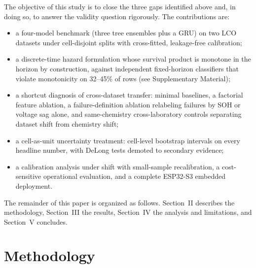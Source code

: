 \documentclass[11pt,a4paper]{article}
\begin{document}
The objective of this study is to close the three gaps identified above and, in doing so, to answer the validity question rigorously. The contributions are:
\begin{itemize}
\item a four-model benchmark (three tree ensembles plus a GRU) on two LCO datasets under cell-disjoint splits with cross-fitted, leakage-free calibration;
\item a discrete-time hazard formulation whose survival product is monotone in the horizon by construction, against independent fixed-horizon classifiers that violate monotonicity on 32--45\% of rows (see Supplementary Material);
\item a shortcut diagnosis of cross-dataset transfer: minimal baselines, a factorial feature ablation, a failure-definition ablation relabeling failures by SOH or voltage sag alone, and same-chemistry cross-laboratory controls separating dataset shift from chemistry shift;
\item a cell-as-unit uncertainty treatment: cell-level bootstrap intervals on every headline number, with DeLong tests demoted to secondary evidence;
\item a calibration analysis under shift with small-sample recalibration, a cost-sensitive operational evaluation, and a complete ESP32-S3 embedded deployment.
\end{itemize}

The remainder of this paper is organized as follows. Section~II describes the methodology, Section~III the results, Section~IV the analysis and limitations, and Section~V concludes.

\section{Methodology}
\end{document}
